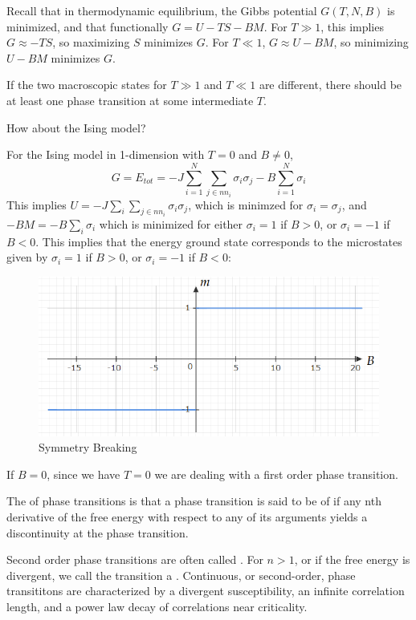 \documentclass[12pt, a4paper, oneside, openright, titlepage]{book}
\begin{document}
Recall that in thermodynamic equilibrium, the Gibbs potential $G(T,N,B)$ is minimized, and that functionally $G = U - TS - BM$. For $T \gg 1$, this implies $G \approx -TS$, so maximizing $S$ minimizes $G$. For $T \ll 1$, $G \approx U - BM$, so minimizing $U - BM$ minimizes $G$. 

If the two macroscopic states for $T \gg 1$ and $T \ll 1$ are different, there should be at least one phase transition at some intermediate $T$.

\begin{qst}
    How about the Ising model?
\end{qst}

\begin{eg}
    For the Ising model in 1-dimension with $T = 0$ and $B \neq 0$, $$G = E_{tot} = -J\sum_{i=1}^N\sum_{j \in nn_i}\sigma_i\sigma_j - B\sum_{i=1}^N\sigma_i$$ This implies $U = -J\sum_i\sum_{j\in nn_i}\sigma_i\sigma_j$, which is minimzed for $\sigma_i = \sigma_j$, and $-BM = -B\sum_i\sigma_i$ which is minimized for either $\sigma_i = 1$ if $B > 0$, or $\sigma_i = -1$ if $B < 0$. This implies that the energy ground state corresponds to the microstates given by $\sigma_i = 1$ if $B > 0$, or $\sigma_i = -1$ if $B < 0$:
    \begin{figure}[H]
        \centering
        \caption{Symmetry Breaking}
        \includegraphics[scale = 0.8]{Images/symmetryBreak.PNG}
    \end{figure}

    If $B = 0$, since we have $T = 0$ we are dealing with a first order phase transition.
\end{eg}

\begin{defn}
    The  of phase transitions is that a phase transition is said to be of  if any nth derivative of the free energy with respect to any of its arguments yields a discontinuity at the phase transition.

    Second order phase transitions are often called . For $n > 1$, or if the free energy is divergent, we call the transition a . Continuous, or second-order, phase transititons are characterized by a divergent susceptibility, an infinite correlation length, and a power law decay of correlations near criticality.
\end{defn}
\end{document}
